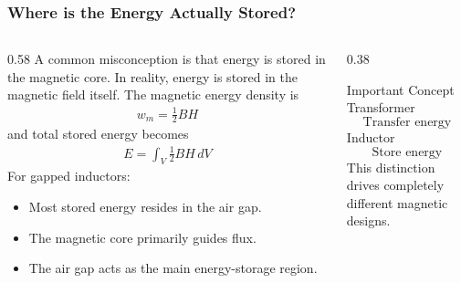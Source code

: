 \begin{frame} 
    \frametitle{Where is the Energy Actually Stored?} 
    \begin{columns} 
        \begin{column}{0.58\textwidth} 
            A common misconception is that energy is stored in the magnetic core. 
            \vspace{0.15cm} 
            In reality, energy is stored in the magnetic field itself. 
            \vspace{0.15cm} 
            The magnetic energy density is 
            \begin{align} 
                w_m = \frac12 BH 
            \end{align} 
            and total stored energy becomes 
            \begin{align} 
                E=\int_V \frac12 BH\,dV 
            \end{align} 
            \vspace{0.15cm} 
            For gapped inductors: 
            \begin{itemize} 
                \item Most stored energy resides in the air gap. 
                \item The magnetic core primarily guides flux. 
                \item The air gap acts as the main energy-storage region. 
            \end{itemize} 
        \end{column} 
        \begin{column}{0.38\textwidth} 
            \begin{block}{Important Concept} 
                Transformer \[ \text{Transfer energy} \] 
                Inductor \[ \text{Store energy} \] 
                This distinction drives completely different magnetic designs. 
            \end{block} 
        \end{column} 
    \end{columns} 
\end{frame}



